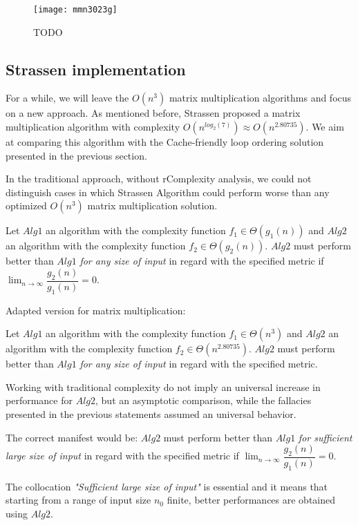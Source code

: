 \begin{figure}[H]
\centering
\texttt{[image: mmn3023g]}
\caption{TODO}
\end{figure}

\subsection{Strassen implementation}

For a while, we will leave the $O(n^3)$ matrix multiplication algorithms and focus on a new approach. As mentioned before, Strassen proposed a matrix multiplication algorithm with complexity $O(n^{log_{2}(7)}) \approx O(n^{2.80735})$. We aim at comparing this algorithm with the Cache-friendly loop ordering solution presented in the previous section.

In the traditional approach, without rComplexity analysis, we could not distinguish cases in which Strassen Algorithm could perform worse than any optimized $O(n^3)$ matrix multiplication solution.


\begin{fallacy}
Let $Alg1$ an algorithm with the complexity function $f_{1} \in \Theta(g_1(n))$  and $Alg2$ an algorithm with the complexity function $f_{2} \in \Theta(g_2(n))$. $Alg2$ must perform better than $Alg1$ \textit{for any size of input} in regard with the specified metric if $\lim_{n\to\infty} \dfrac{g_2(n)}{g_1(n)} = 0$.
\end{fallacy}


\begin{fallacy}
Adapted version for matrix multiplication:

Let $Alg1$ an algorithm with the complexity function $f_{1} \in \Theta(n^3)$  and $Alg2$ an algorithm with the complexity function $f_{2} \in \Theta(n^{2.80735})$. $Alg2$ must perform better than $Alg1$ \textit{for any size of input} in regard with the specified metric.
\end{fallacy}

Working with traditional complexity do not imply an universal increase in performance for $Alg2$, but an asymptotic comparison, while the fallacies presented in the previous statements assumed an universal behavior.

The correct manifest would be: $Alg2$ must perform better than $Alg1$ \textit{for sufficient large size of input} in regard with the specified metric if $\lim_{n\to\infty} \dfrac{g_2(n)}{g_1(n)} = 0$.

The collocation
\textit{"Sufficient large size of input"} is essential and it means that starting from a range of input size $n_{0}$ finite, better performances are obtained using $Alg2$.


